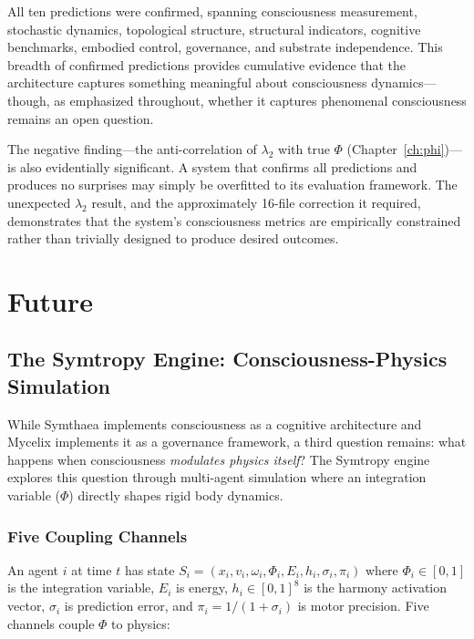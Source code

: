 \documentclass[12pt]{book}
\begin{document}
All ten predictions were confirmed, spanning consciousness measurement, stochastic dynamics, topological structure, structural indicators, cognitive benchmarks, embodied control, governance, and substrate independence. This breadth of confirmed predictions provides cumulative evidence that the architecture captures something meaningful about consciousness dynamics---though, as emphasized throughout, whether it captures phenomenal consciousness remains an open question.

The negative finding---the anti-correlation of $\lambda_2$ with true $\Phi$ (Chapter~\ref{ch:phi})---is also evidentially significant. A system that confirms all predictions and produces no surprises may simply be overfitted to its evaluation framework. The unexpected $\lambda_2$ result, and the approximately 16-file correction it required, demonstrates that the system's consciousness metrics are empirically constrained rather than trivially designed to produce desired outcomes.



\part{Future}

\chapter{The Symtropy Engine: Consciousness-Physics Simulation}
\label{ch:symtropy}

While Symthaea implements consciousness as a cognitive architecture and Mycelix implements it as a governance framework, a third question remains: what happens when consciousness \textit{modulates physics itself}? The Symtropy engine explores this question through multi-agent simulation where an integration variable ($\Phi$) directly shapes rigid body dynamics.

\section{Five Coupling Channels}

An agent $i$ at time $t$ has state $S_i = (x_i, v_i, \omega_i, \Phi_i, E_i, h_i, \sigma_i, \pi_i)$ where $\Phi_i \in [0,1]$ is the integration variable, $E_i$ is energy, $h_i \in [0,1]^8$ is the harmony activation vector, $\sigma_i$ is prediction error, and $\pi_i = 1/(1+\sigma_i)$ is motor precision. Five channels couple $\Phi$ to physics:
\end{document}

